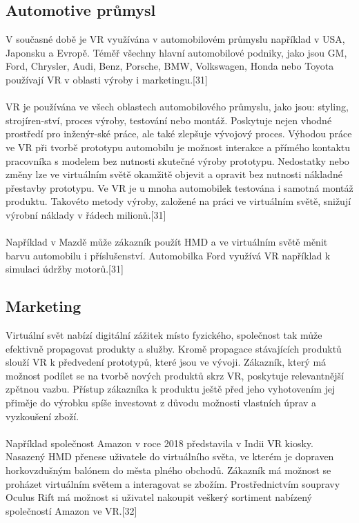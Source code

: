 \documentclass[a4paper, 12pt]{report}
\begin{document}
\subsection{Automotive průmysl}
V současné době je VR využívána v automobilovém průmyslu například v USA, Japonsku a Evropě. Téměř všechny hlavní automobilové podniky, jako jsou GM, Ford, Chrysler, Audi, Benz, Porsche, BMW, Volkswagen, Honda nebo Toyota používají VR v oblasti výroby i marketingu.[31]\\
\\
VR je používána ve všech oblastech automobilového průmyslu, jako jsou: styling, strojíren-ství,
proces výroby, testování nebo montáž. Poskytuje nejen vhodné prostředí pro inženýr-ské práce, ale také zlepšuje vývojový proces. Výhodou práce ve VR při tvorbě prototypu automobilu je možnost interakce a přímého kontaktu pracovníka s modelem bez nutnosti skutečné výroby prototypu. Nedostatky nebo změny lze ve virtuálním světě okamžitě objevit a opravit bez nutnosti nákladné přestavby prototypu. Ve VR je u mnoha automobilek testována i samotná montáž produktu. Takovéto metody výroby, založené na práci ve virtuálním světě, snižují výrobní náklady v řádech milionů.[31]\\
\\
Například v Mazdě může zákazník použít HMD a ve virtuálním světě měnit barvu automobilu i příslušenství. Automobilka Ford využívá VR například k simulaci údržby motorů.[31]

\subsection{Marketing}
Virtuální svět nabízí digitální zážitek místo fyzického, společnost tak může efektivně propagovat produkty a služby. Kromě propagace stávajících produktů slouží VR k předvedení prototypů, které jsou ve vývoji. Zákazník, který má možnost podílet se na tvorbě nových produktů skrz VR, poskytuje relevantnější zpětnou vazbu. Přístup zákazníka k produktu ještě před jeho vyhotovením jej přiměje do výrobku spíše investovat z důvodu možnosti vlastních úprav a vyzkoušení zboží.\\
\\
Například společnost Amazon v roce 2018 představila v Indii VR kiosky. Nasazený HMD přenese uživatele do virtuálního světa, ve kterém je dopraven horkovzdušným balónem do města plného obchodů. Zákazník má možnost se proházet virtuálním světem a interagovat se zbožím. Prostřednictvím soupravy Oculus Rift má možnost si uživatel nakoupit veškerý sortiment nabízený společností Amazon ve VR.[32]
\end{document}

